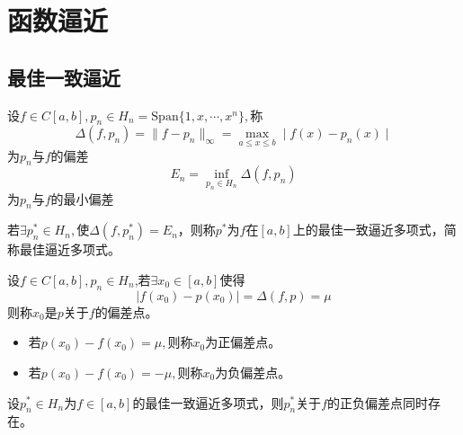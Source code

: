 \section{函数逼近}
\subsection{最佳一致逼近}
\begin{definition}
    设$f\in C[a,b],p_{n}\in H_{n}=\mathrm{Span}\{1,x,\cdots,x^{n}\},$称
    \[
        \Delta(f,p_n)=\parallel f-p_n\parallel_\infty=\max_{a\leq x\leq b}\mid f(x)-p_n(x)\mid 
    \]
    为$p_{n}$与$f$的偏差
    \[
        E_{n}=\operatorname*{inf}_{p_{n}\in H_{n}}\Delta(f,p_{n})
    \]
    为$p_{n}$与$f$的最小偏差
    
    若$\exists p_{n}^{*}\in H_{n},$使$\Delta(f,p_{n}^{*})=E_{n}$，则称$p^{*}$为$f$在$\left[ a,b \right]$上的最佳一致逼近多项式，简称最佳逼近多项式。
\end{definition}
\begin{definition}[偏差点]
    设$f\in C[a,b],p_{n}\in H_{n}$,若$\exists x_0\in[a,b]$使得
    \[
        \mid f(x_0)-p(x_0)\mid=\Delta(f,p)=\mu 
    \]
    则称$x_0$是$p$关于$f$的偏差点。

    \begin{itemize}
        \item 若$p(x_{0})-f(x_{0})=\mu,$则称$x_0$为正偏差点。
        \item 若$p(x_{0})-f(x_{0})=-\mu,$则称$x_0$为负偏差点。
    \end{itemize}
\end{definition}
\begin{theorem}
    设$p_{n}^{*}\in H_{n}$为$f\in\left[ a,b \right]$的最佳一致逼近多项式，则$p_{n}^{*}$关于$f$的正负偏差点同时存在。
\end{theorem}
